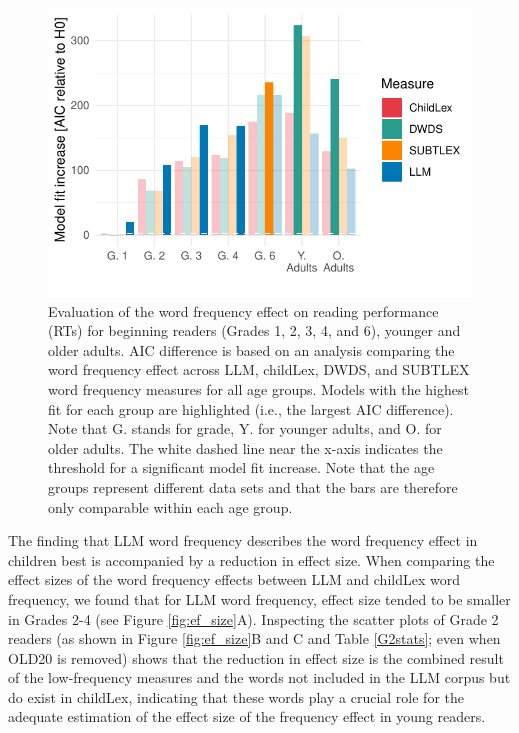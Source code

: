 \documentclass[manuscript]{stjour}
\begin{document}
\begin{figure}[!htbp]
    \centering
    \includegraphics[scale=1]{figures/exp1_modelcomp.pdf}
    \caption{Evaluation of the word frequency effect on reading performance (RTs) for beginning readers (Grades 1, 2, 3, 4, and 6), younger and older adults. AIC difference is based on an analysis comparing the word frequency effect across LLM, childLex, DWDS, and SUBTLEX word frequency measures for all age groups. Models with the highest fit for each group are highlighted (i.e., the largest AIC difference). Note that G. stands for grade, Y. for younger adults, and O. for older adults. The white dashed line near the x-axis indicates the threshold for a significant model fit increase. Note that the age groups represent different data sets and that the bars are therefore only comparable within each age group.}
\label{fig:modelcomprt}
\end{figure}

The finding that LLM word frequency describes the word frequency effect in children best is accompanied by a reduction in effect size. When comparing the effect sizes of the word frequency effects between LLM and childLex word frequency, we found that for LLM word frequency, effect size tended to be smaller in Grades 2-4 (see Figure \ref{fig:ef_size}A). Inspecting the scatter plots of Grade 2 readers (as shown in Figure \ref{fig:ef_size}B and C and Table \ref{G2stats}; even when OLD20 is removed) shows that the reduction in effect size is the combined result of the low-frequency measures and the words not included in the LLM corpus but do exist in childLex, indicating that these words play a crucial role for the adequate estimation of the effect size of the frequency effect in young readers.
\end{document}
